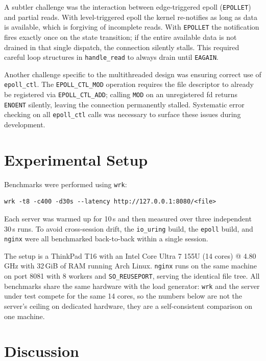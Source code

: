 \documentclass{article}
\begin{document}
A subtler challenge was the interaction between edge-triggered epoll (\texttt{EPOLLET}) and
partial reads. With level-triggered epoll the kernel re-notifies as long as data is available,
which is forgiving of incomplete reads. With \texttt{EPOLLET} the notification fires exactly
once on the state transition; if the entire available data is not drained in that single
dispatch, the connection silently stalls. This required careful loop structures in
\texttt{handle\_read} to always drain until \texttt{EAGAIN}.

Another challenge specific to the multithreaded design was ensuring correct use of
\texttt{epoll\_ctl}. The \texttt{EPOLL\_CTL\_MOD} operation requires the file descriptor to
already be registered via \texttt{EPOLL\_CTL\_ADD}; calling \texttt{MOD} on an unregistered
fd returns \texttt{ENOENT} silently, leaving the connection permanently stalled. Systematic
error checking on all \texttt{epoll\_ctl} calls was necessary to surface these issues during
development.

\section{Experimental Setup}

Benchmarks were performed using \texttt{wrk}:
\begin{verbatim}
wrk -t8 -c400 -d30s --latency http://127.0.0.1:8080/<file>
\end{verbatim}

Each server was warmed up for 10\,s and then measured over three independent 30\,s runs.
To avoid cross-session drift, the \texttt{io\_uring} build, the \texttt{epoll} build, and
\texttt{nginx} were all benchmarked back-to-back within a single session.

The setup is a ThinkPad T16 with an Intel Core Ultra 7 155U (14 cores) @ 4.80\,GHz with
32\,GiB of RAM running Arch Linux. \texttt{nginx} runs on the same machine on port 8081
with 8 workers and \texttt{SO\_REUSEPORT}, serving the identical file tree. All benchmarks
share the same hardware with the load generator: \texttt{wrk} and the server under test compete for the same 14 cores, so the numbers below are not the server's ceiling on dedicated hardware, they are a self-consistent comparison on one machine.

\section{Discussion}
\end{document}
